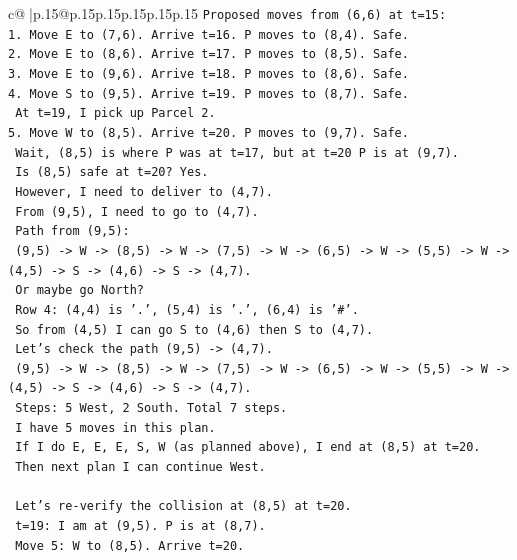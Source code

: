 \documentclass{article}
\begin{document}
{\begin{supertabular}{c@{$\;$}|p{.15\linewidth}@{}p{.15\linewidth}p{.15\linewidth}p{.15\linewidth}p{.15\linewidth}p{.15\linewidth}}
{{{\texttt{Proposed moves from (6,6) at t=15:} \\
\texttt{1. Move E to (7,6). Arrive t=16. P moves to (8,4). Safe.} \\
\texttt{2. Move E to (8,6). Arrive t=17. P moves to (8,5). Safe.} \\
\texttt{3. Move E to (9,6). Arrive t=18. P moves to (8,6). Safe.} \\
\texttt{4. Move S to (9,5). Arrive t=19. P moves to (8,7). Safe.} \\
\texttt{   At t=19, I pick up Parcel 2.} \\
\texttt{5. Move W to (8,5). Arrive t=20. P moves to (9,7). Safe.} \\
\texttt{   Wait, (8,5) is where P was at t=17, but at t=20 P is at (9,7).} \\
\texttt{   Is (8,5) safe at t=20? Yes.} \\
\texttt{   However, I need to deliver to (4,7).} \\
\texttt{   From (9,5), I need to go to (4,7).} \\
\texttt{   Path from (9,5):} \\
\texttt{   (9,5) {-}> W {-}> (8,5) {-}> W {-}> (7,5) {-}> W {-}> (6,5) {-}> W {-}> (5,5) {-}> W {-}> (4,5) {-}> S {-}> (4,6) {-}> S {-}> (4,7).} \\
\texttt{   Or maybe go North?} \\
\texttt{   Row 4: (4,4) is '.', (5,4) is '.', (6,4) is '\#'.} \\
\texttt{   So from (4,5) I can go S to (4,6) then S to (4,7).} \\
\texttt{   Let's check the path (9,5) {-}> (4,7).} \\
\texttt{   (9,5) {-}> W {-}> (8,5) {-}> W {-}> (7,5) {-}> W {-}> (6,5) {-}> W {-}> (5,5) {-}> W {-}> (4,5) {-}> S {-}> (4,6) {-}> S {-}> (4,7).} \\
\texttt{   Steps: 5 West, 2 South. Total 7 steps.} \\
\texttt{   I have 5 moves in this plan.} \\
\texttt{   If I do E, E, E, S, W (as planned above), I end at (8,5) at t=20.} \\
\texttt{   Then next plan I can continue West.} \\
\\ 
\texttt{   Let's re{-}verify the collision at (8,5) at t=20.} \\
\texttt{   t=19: I am at (9,5). P is at (8,7).} \\
\texttt{   Move 5: W to (8,5). Arrive t=20.} \\
}}}
\end{supertabular}}
\end{document}
